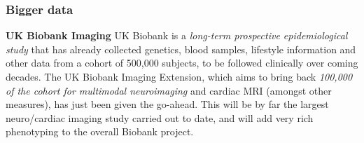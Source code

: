 \begin{frame}
\frametitle{Bigger data}
{\bf UK Biobank Imaging} UK Biobank is a \emph{long-term prospective epidemiological study} that has already collected genetics, blood samples, lifestyle information and other data from a cohort of 500,000 subjects, to be followed clinically over coming decades.
The UK Biobank Imaging Extension, which aims to bring back \emph{100,000 of the cohort for multimodal neuroimaging} and cardiac MRI (amongst other measures), has just been given the go-ahead.
This will be by far the largest neuro/cardiac imaging study carried out to date, and will add very rich phenotyping to the overall Biobank project.
\end{frame}

